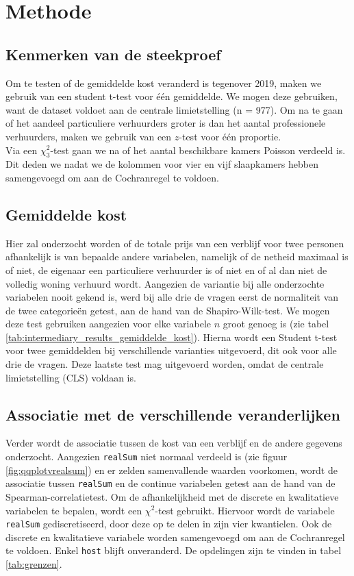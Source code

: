 \documentclass[a4paper]{kulakarticle}
\begin{document}
	\section{Methode}
	
	\subsection{Kenmerken van de steekproef}
	Om te testen of de gemiddelde kost veranderd is tegenover 2019, maken we gebruik van een student t-test voor één gemiddelde. We mogen deze gebruiken, want de dataset voldoet aan de centrale limietstelling (n = 977). Om na te gaan of het aandeel particuliere verhuurders groter is dan het aantal professionele verhuurders, maken we gebruik van een $z$-test voor één proportie.\\
	Via een $\chi^2_{3}$-test gaan we na of het aantal beschikbare kamers Poisson verdeeld is. Dit deden we nadat we de kolommen voor vier en vijf slaapkamers hebben samengevoegd om aan de Cochranregel te voldoen.
	
	\subsection{Gemiddelde kost}
	
	Hier zal onderzocht worden of de totale prijs van een verblijf voor twee personen afhankelijk is van bepaalde andere variabelen, namelijk of de netheid maximaal is of niet, de eigenaar een particuliere verhuurder is of niet en of al dan niet de volledig woning verhuurd wordt.
	Aangezien de variantie bij alle onderzochte variabelen nooit gekend is, werd bij alle drie de vragen eerst de normaliteit van de twee categorieën getest, aan de hand van de Shapiro-Wilk-test. We mogen deze test gebruiken aangezien voor elke variabele $n$ groot genoeg is (zie tabel \ref{tab:intermediary_results_gemiddelde_kost}). Hierna wordt een Student t-test voor twee gemiddelden bij verschillende varianties uitgevoerd, dit ook voor alle drie de vragen. Deze laatste test mag uitgevoerd worden, omdat de centrale limietstelling (CLS) voldaan is.

	\subsection{Associatie met de verschillende veranderlijken}
	
	Verder wordt de associatie tussen de kost van een verblijf en de andere gegevens onderzocht. Aangezien \verb|realSum| niet normaal verdeeld is (zie figuur \ref{fig:qqplotvrealsum}) en er zelden samenvallende waarden voorkomen, wordt de associatie tussen \verb|realSum| en de continue variabelen getest aan de hand van de Spearman-correlatietest. Om de afhankelijkheid met de discrete en kwalitatieve variabelen te bepalen, wordt een $\chi ^2$-test gebruikt. Hiervoor wordt de variabele \verb|realSum| gediscretiseerd, door deze op te delen in zijn vier kwantielen. Ook de discrete en kwalitatieve variabele worden samengevoegd om aan de Cochranregel te voldoen. Enkel \verb|host| blijft onveranderd. De opdelingen zijn te vinden in tabel \ref{tab:grenzen}. \\\\
	
\end{document}
